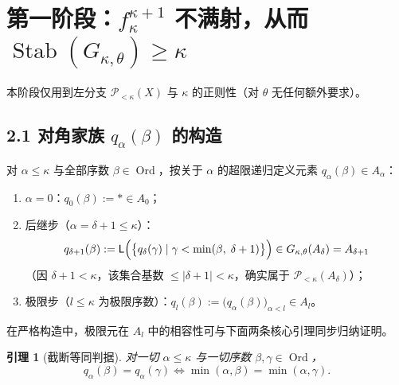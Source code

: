 \documentclass[11pt,a4paper]{ctexart}
\theoremstyle{definition}
\theoremstyle{plain}
\newtheorem{lemma}[definition]{引理}
\newcommand{\Stab}{\operatorname{Stab}}
\newcommand{\Ord}{\operatorname{Ord}}
\begin{document}
\section{第一阶段：$f_\kappa^{\kappa+1}$ 不满射，从而 $\Stab(G_{\kappa,\theta}) \ge \kappa$}

本阶段仅用到左分支 $\mathcal{P}_{<\kappa}(X)$ 与 $\kappa$ 的正则性（对 $\theta$ 无任何额外要求）。

\subsection*{2.1 对角家族 $q_\alpha(\beta)$ 的构造}

对 $\alpha \le \kappa$ 与全部序数 $\beta \in \Ord$，按关于 $\alpha$ 的超限递归定义元素 $q_\alpha(\beta) \in A_\alpha$：
\begin{enumerate}[label=(\arabic*)]
  \item $\alpha = 0$：$q_0(\beta) := * \in A_0$；
  \item 后继步（$\alpha = \delta + 1 \le \kappa$）：
    \[
      q_{\delta+1}(\beta) := \mathsf{L}\Bigl(\bigl\{ q_\delta(\gamma) \mid \gamma < \min(\beta,\; \delta+1) \bigr\}\Bigr) \in G_{\kappa,\theta}(A_\delta) = A_{\delta+1}
    \]
    （因 $\delta+1 < \kappa$，该集合基数 $\le |\delta+1| < \kappa$，确实属于 $\mathcal{P}_{<\kappa}(A_\delta)$）；
  \item 极限步（$l \le \kappa$ 为极限序数）：$q_l(\beta) := \bigl(q_\alpha(\beta)\bigr)_{\alpha < l} \in A_l$。
\end{enumerate}
在严格构造中，极限元在 $A_l$ 中的相容性可与下面两条核心引理同步归纳证明。

\begin{lemma}[截断等同判据]
对一切 $\alpha \le \kappa$ 与一切序数 $\beta, \gamma \in \Ord$，
\[
  q_\alpha(\beta) = q_\alpha(\gamma) \iff \min(\alpha, \beta) = \min(\alpha, \gamma).
\]
\end{lemma}
\end{document}
